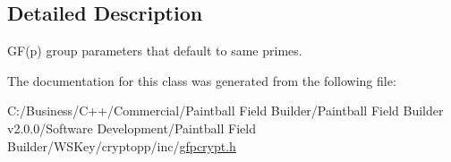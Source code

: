 \subsection{Detailed Description}
GF(p) group parameters that default to same primes. 

The documentation for this class was generated from the following file:\begin{DoxyCompactItemize}
\item 
C:/Business/C++/Commercial/Paintball Field Builder/Paintball Field Builder v2.0.0/Software Development/Paintball Field Builder/WSKey/cryptopp/inc/\hyperlink{gfpcrypt_8h}{gfpcrypt.h}\end{DoxyCompactItemize}
